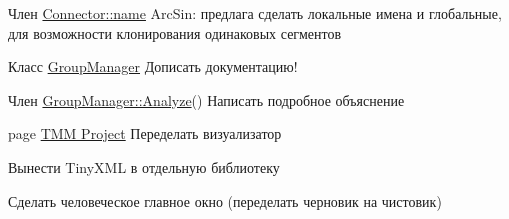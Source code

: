 \label{todo__todo000002}
\hypertarget{todo__todo000002}{}
 
\begin{DoxyDescription}
\item[Член \hyperlink{struct_connector_a2f236cf078849dbb78abc1fb8da87ace}{Connector::name} ]ArcSin: предлага сделать локальные имена и глобальные, для возможности клонирования одинаковых сегментов 
\end{DoxyDescription}

\label{todo__todo000003}
\hypertarget{todo__todo000003}{}
 
\begin{DoxyDescription}
\item[Класс \hyperlink{class_group_manager}{GroupManager} ]Дописать документацию! 
\end{DoxyDescription}

\label{todo__todo000004}
\hypertarget{todo__todo000004}{}
 
\begin{DoxyDescription}
\item[Член \hyperlink{class_group_manager_abbbf104fb7ed58d2113cdffbf070f0df}{GroupManager::Analyze}() ]Написать подробное объяснение 
\end{DoxyDescription}

\label{todo__todo000001}
\hypertarget{todo__todo000001}{}
 
\begin{DoxyDescription}
\item[page \hyperlink{index}{TMM Project} ]Переделать визуализатор 

Вынести TinyXML в отдельную библиотеку 

Сделать человеческое главное окно (переделать черновик на чистовик) 
\end{DoxyDescription}